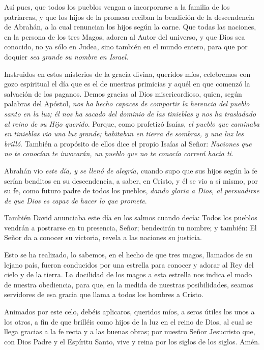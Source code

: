 Así pues, que todos los pueblos vengan a incorporarse a la familia de los patriarcas, y que los hijos de la promesa reciban la bendición de la descendencia de Abrahán, a la cual renuncian los hijos según la carne. Que todas las naciones, en la persona de los tres Magos, adoren al Autor del universo, y que Dios sea conocido, no ya sólo en Judea, sino también en el mundo entero, para que por doquier \emph{sea grande su nombre en Israel}.

Instruidos en estos misterios de la gracia divina, queridos míos, celebremos con gozo espiritual el día que es el de nuestras primicias y aquél en que comenzó la salvación de los paganos. Demos gracias al Dios misericordioso, quien, según palabras del Apóstol, \emph{nos ha hecho capaces de compartir la herencia del pueblo santo en la luz; él nos ha sacado del dominio de las tinieblas y nos ha trasladado al reino de su Hijo querido}. Porque, como profetizó Isaías, \emph{el pueblo que caminaba en tinieblas vio una luz grande; habitaban en tierra de sombras, y una luz les brilló}. También a propósito de ellos dice el propio Isaías al Señor: \emph{Naciones que no te conocían te invocarán, un pueblo que no te conocía correrá hacia ti}.

Abrahán vio \emph{este día, y se llenó de alegría,} cuando supo que sus hijos según la fe serían benditos en su descendencia, a saber, en Cristo, y él se vio a sí mismo, por su fe, como futuro padre de todos los pueblos, \emph{dando gloria a Dios, al persuadirse de que Dios es capaz de hacer lo que promete}.

También David anunciaba este día en los salmos cuando decía: Todos los pueblos vendrán a postrarse en tu presencia, Señor; bendecirán tu nombre; y también: El Señor da a conocer su victoria, revela a las naciones su justicia.

Esto se ha realizado, lo sabemos, en el hecho de que tres magos, llamados de su lejano país, fueron conducidos por una estrella para conocer y adorar al Rey del cielo y de la tierra. La docilidad de los magos a esta estrella nos indica el modo de nuestra obediencia, para que, en la medida de nuestras posibilidades, seamos servidores de esa gracia que llama a todos los hombres a Cristo.

Animados por este celo, debéis aplicaros, queridos míos, a seros útiles los unos a los otros, a fin de que brilléis como hijos de la luz en el reino de Dios, al cual se llega gracias a la fe recta y a las buenas obras; por nuestro Señor Jesucristo que, con Dios Padre y el Espíritu Santo, vive y reina por los siglos de los siglos. Amén.

